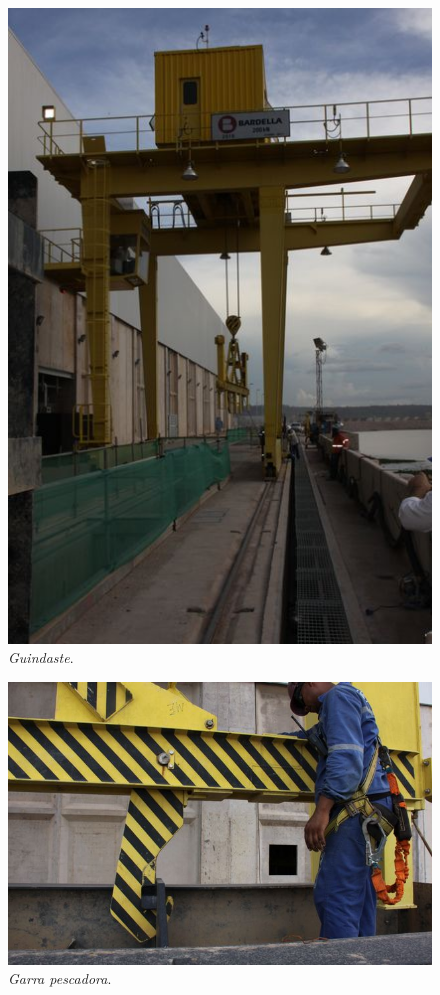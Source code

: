 \begin{figure}[H]
    \centering
    \includegraphics[width=1\columnwidth]{figs/nomenclatura/3.jpg}
    \caption{\emph{Guindaste}.}
    \label{nomenclatura_3}
\end{figure}

\begin{figure}[H]
    \centering
    \includegraphics[width=1\columnwidth]{figs/nomenclatura/4.jpg}
    \caption{\emph{Garra pescadora}.}
    \label{nomenclatura_4}
\end{figure}

